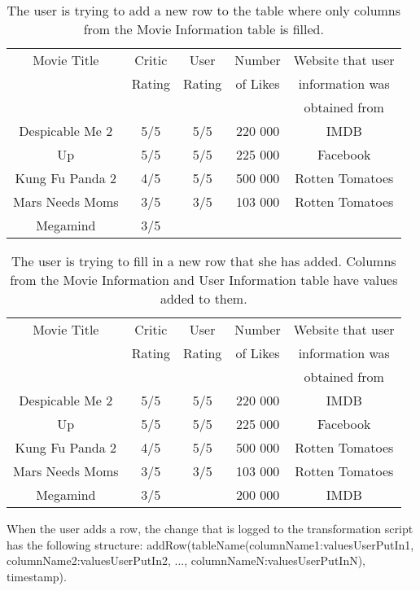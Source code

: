 \documentclass[12pt]{article}
\begin{document}
\begin{table}[h!]
\centering
\begin{tabular}{ | c | c | c | c | c | }
 \hline
    Movie Title & Critic  & User & Number & Website that user\\
    & Rating & Rating & of Likes & information was \\
    &&&& obtained from\\ \hline \hline
    Despicable Me 2 & 5/5 & 5/5 & 220 000 & IMDB\\ \hline
    Up & 5/5 & 5/5 & 225 000 & Facebook\\ \hline
    Kung Fu Panda 2 & 4/5 & 5/5 & 500 000 & Rotten Tomatoes\\ \hline
    Mars Needs Moms & 3/5 & 3/5 & 103 000 & Rotten Tomatoes\\ \hline
    Megamind & 3/5 &  &  & \\
    \hline
\end{tabular}
\caption{The user is trying to add a new row to the table where only columns from the Movie Information table is filled.}
\label{table:add_row_table_example2}
\end{table}

\begin{table}[h!]
\centering
\begin{tabular}{ | c | c | c | c | c | }
 \hline
    Movie Title & Critic  & User & Number & Website that user\\
    & Rating & Rating & of Likes & information was \\
    &&&& obtained from\\ \hline \hline
    Despicable Me 2 & 5/5 & 5/5 & 220 000 & IMDB\\ \hline
    Up & 5/5 & 5/5 & 225 000 & Facebook\\ \hline
    Kung Fu Panda 2 & 4/5 & 5/5 & 500 000 & Rotten Tomatoes\\ \hline
    Mars Needs Moms & 3/5 & 3/5 & 103 000 & Rotten Tomatoes\\ \hline
    Megamind & 3/5 & & 200 000 & IMDB \\
    \hline
\end{tabular}
\caption{The user is trying to fill in a new row that she has added. Columns from the Movie Information and User Information table have values added to them.}
\label{table:add_row_table_example3}
\end{table}

When the user adds a row, the change that is logged to the transformation script has the following structure: addRow(tableName(columnName1:valuesUserPutIn1, columnName2:valuesUserPutIn2, ..., columnNameN:valuesUserPutInN), timestamp).
\end{document}
